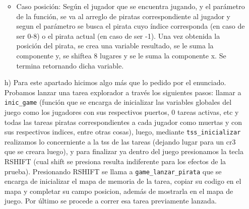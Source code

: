 \begin{enumerate}
\begin{itemize}
\item Caso posición: Según el jugador que se encuentra jugando, y el parámetro de la función, se va al arreglo de piratas correspondiente al jugador y segun el parámetro se busca el pirata cuyo índice corresponda (en caso de ser 0-8) o el pirata actual (en caso de ser -1). Una vez obtenida la posición del pirata, se crea una variable resultado, se le suma la componente y, se shiftea 8 lugares y se le suma la componente x. Se termina retornando dicha variable.
\end{itemize}
\item[h)]Para este apartado hicimos algo más que lo pedido por el enunciado. Probamos lanzar una tarea explorador a través los siguientes pasos: llamar a {\tt inic_game} (función que se encarga de inicializar las variables globales del juego como los jugadores con sus respectivos puertos, 0 tareas activas, etc y todas las tareas piratas correspondientes a cada jugador como muertas y con sus respectivos indices, entre otras cosas), luego, mediante {\tt tss_inicializar} realizamos lo concerniente a la tss de las tareas (dejando lugar para un cr3 que se creara luego), y para finalizar ya dentro del juego presionamos la tecla RSHIFT (cual shift se presiona resulta indiferente para los efectos de la prueba). Presionando RSHIFT se llama a {\tt game_lanzar_pirata} que se encarga de inicializar el mapa de memoria de la tarea, copiar su codigo en el mapa y completar su campo posicion, además de mostrarla en el mapa de juego. Por último se procede a correr esa tarea previamente lanzada.

\end{enumerate}